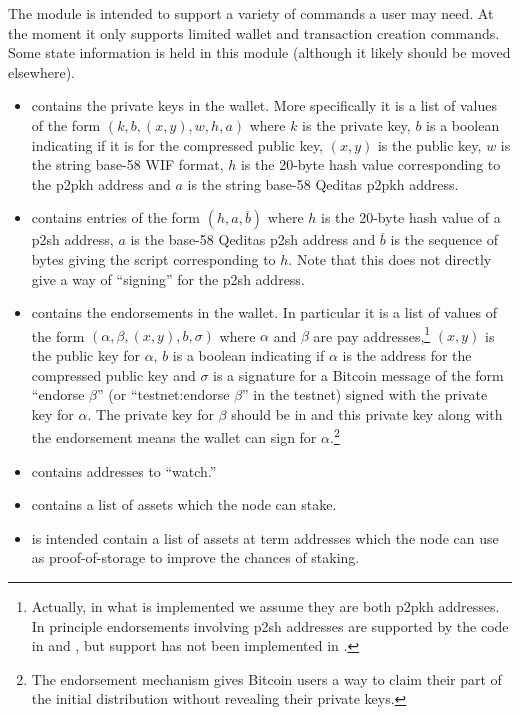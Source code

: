 {The module {} is intended to support a variety of commands a user may need.
At the moment it only supports limited wallet and transaction creation commands.
Some state information is held in this module (although it likely should be moved elsewhere).
\begin{itemize}
\item {} contains the private keys in the wallet.
More specifically it is a list of values of the form $(k,b,(x,y),w,h,a)$
where $k$ is the private key, $b$ is a boolean indicating if it is for the compressed public key,
$(x,y)$ is the public key, $w$ is the string base-58 WIF format, $h$ is the 20-byte hash value
corresponding to the p2pkh address and $a$ is the string base-58 Qeditas p2pkh address.
\item {} contains entries of the form $(h,a,\overline{b})$
where $h$ is the 20-byte hash value of a p2sh address, $a$ is the base-58 Qeditas p2sh address
and $\overline{b}$ is the sequence of bytes giving the script corresponding to $h$.
Note that this does not directly give a way of ``signing'' for the p2sh address.
\item {} contains the endorsements in the wallet.
In particular it is a list of values of the form $(\alpha,\beta,(x,y),b,\sigma)$
where $\alpha$ and $\beta$ are pay addresses,\footnote{Actually, in what is implemented we assume they are both p2pkh addresses. In principle endorsements involving p2sh addresses are supported by the code in {} and {}, but support has not been implemented in {}.}
$(x,y)$ is the public key for $\alpha$,
$b$ is a boolean indicating if $\alpha$ is the address for the compressed public key
and $\sigma$ is a signature for a
Bitcoin message of the form ``endorse $\beta$''
(or ``testnet:endorse $\beta$'' in the testnet)
signed with the private key for $\alpha$.
The private key for $\beta$ should be in {}
and this private key along with the endorsement means the wallet can sign for $\alpha$.\footnote{The endorsement mechanism gives Bitcoin users a way to claim their part of the initial distribution without revealing their private keys.}
\item {}
contains addresses to ``watch.'' 
\item {}
contains a list of assets which the node can stake.
\item {}
is intended contain a list of assets at term addresses which the node can use as proof-of-storage to improve the chances of staking.

\end{itemize}}
